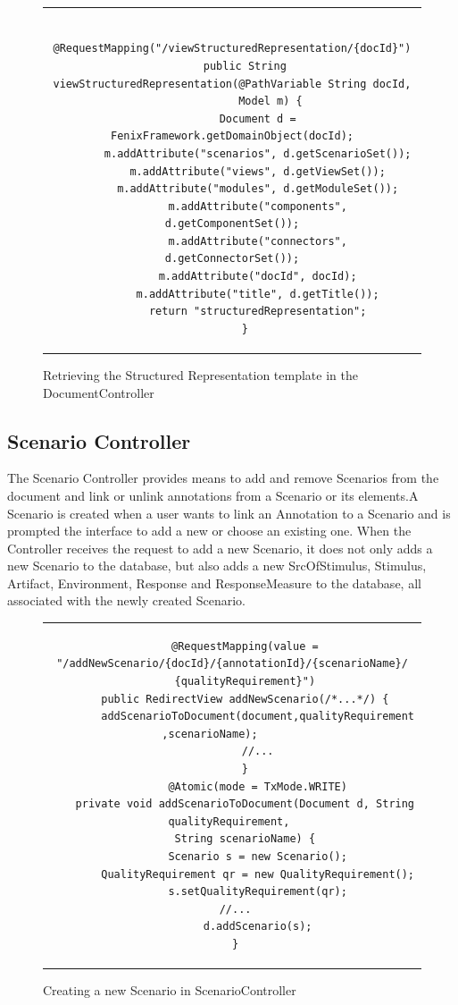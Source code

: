 \begin{itemize}
\begin{figure}[h]
\centering
\lstset{style=customjava}
\begin{tabular}{c}
\begin{lstlisting}
	@RequestMapping("/viewStructuredRepresentation/{docId}")
	public String viewStructuredRepresentation(@PathVariable String docId,
			Model m) {
		Document d = FenixFramework.getDomainObject(docId);
		m.addAttribute("scenarios", d.getScenarioSet());
		m.addAttribute("views", d.getViewSet());
		m.addAttribute("modules", d.getModuleSet());
		m.addAttribute("components", d.getComponentSet());
		m.addAttribute("connectors", d.getConnectorSet());
		m.addAttribute("docId", docId);
		m.addAttribute("title", d.getTitle());
		return "structuredRepresentation";
	}
\end{lstlisting}
\end{tabular}
\caption{Retrieving the Structured Representation template in the DocumentController}
\label{figure:documentControllerStructuredRepresentation}
\end{figure}
\end{itemize}

\subsection{Scenario Controller}

The Scenario Controller provides means to add and remove Scenarios from the document and link or unlink annotations from a Scenario or its elements.A Scenario is created when a user wants to link an Annotation to a Scenario and is prompted the interface to add a new or choose an existing one. When the Controller receives the request to add a new Scenario, it does not only adds a new Scenario to the database, but also adds a new SrcOfStimulus, Stimulus, Artifact, Environment, Response and ResponseMeasure to the database, all associated with the newly created Scenario. 

\begin{figure}[h]
\centering
\lstset{style=customjava}
\begin{tabular}{c}
\begin{lstlisting}
	@RequestMapping(value = "/addNewScenario/{docId}/{annotationId}/{scenarioName}/
	{qualityRequirement}")
	public RedirectView addNewScenario(/*...*/) {
		addScenarioToDocument(document,qualityRequirement ,scenarioName);		
		//...
	}
		@Atomic(mode = TxMode.WRITE)
	private void addScenarioToDocument(Document d, String qualityRequirement, 
	String scenarioName) {
		Scenario s = new Scenario();
		QualityRequirement qr = new QualityRequirement();
		s.setQualityRequirement(qr);
		//...		
		d.addScenario(s);
	}	
\end{lstlisting}
\end{tabular}
\caption{Creating a new Scenario in ScenarioController}
\label{figure:scenarioControllerNewScenario}
\end{figure}

